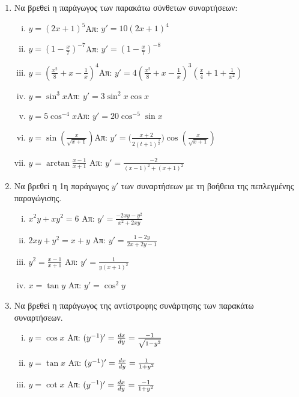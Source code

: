 \documentclass[a4paper,12pt]{article}
\begin{document}
\begin{enumerate}
\pagebreak

\item Να βρεθεί η παράγωγος των παρακάτω σύνθετων συναρτήσεων:

\begin{enumerate}[i)]
\item $y=(2x+1)^5$\hfill Απ: $y'=10(2x+1)^4$
\item $y=\left(1-\frac{x}{7}\right)^{-7}$\hfill Απ: $y'=\left(1-\frac{x}{7}\right)^{-8}$
\item $y=\left(\frac{x^2}{8}+x-\frac{1}{x}\right)^4$\hfill Απ: $y'=4\left(\frac{x^2}{8}+x-\frac{1}{x}\right)^3\left(\frac{x}{4}+1+\frac{1}{x^2}\right)$
\item $y=\sin^3 x$\hfill Απ: $y'=3\sin^2x \cos x$
\item $y=5\cos^{-4}x$\hfill Απ: $y'=20\cos^{-5}\sin x$
\item $y=\sin\left(\frac{x}{\sqrt{x+1}}\right)$\hfill Απ: $y'=\biggl(\frac{x+2}{2(t+1)^{\frac{3}{2}}}\biggr)\cos\left(\frac{x}{\sqrt{x+1}}\right)$
\item $ y = \arctan{\frac{x-1}{x+1}}  $ \hfill Απ: $ y' = \frac{-2}{(x-1)^{2} + (x+1)^{2}} $
\end{enumerate}

\item Να βρεθεί η 1η παράγωγος $ y' $ των συναρτήσεων με τη βοήθεια της πεπλεγμένης
	παραγώγισης.

	\begin{enumerate}[i)]
		\item $  x^{2}y + xy^{2} = 6 $ \hfill Απ: $ y'  = \frac{-2xy - y^{2}}{x^{2} + 2xy}
			$
		\item $  2xy + y^{2} = x+y $ \hfill Απ: $ y' =  \frac{1-2y}{2x+2y-1} $
		\item $ y^{2} = \frac{x-1}{x+1} $ \hfill Απ: $ y' =  \frac{1}{y(x+1)^{2}} $
		\item $  x = \tan y $ \hfill Απ: $ y'  = \cos^{2}{y} $
	\end{enumerate}

\item Να βρεθεί η παράγωγος της αντίστροφης συνάρτησης των παρακάτω συναρτήσεων.

	\begin{enumerate}[i)]
		\item $ y = \cos{x} $ \hfill Απ: $ (y^{-1})' = \dv{x}{y} = \frac{-1}{\sqrt{1-y^{2}}} $
		\item $ y = \tan{x} $ \hfill Απ: $ (y^{-1})' = \dv{x}{y} = \frac{1}{1+y^{2}} $
		\item $ y = \cot{x} $ \hfill Απ: $ (y^{-1})' = \dv{x}{y} = \frac{-1}{1+y^{2}} $
	\end{enumerate}
	

\end{enumerate}
\end{document}

